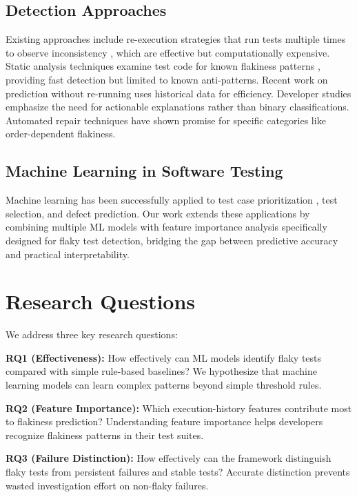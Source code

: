 \documentclass[conference]{IEEEtran}
\begin{document}
\subsection{Detection Approaches}
Existing approaches include re-execution strategies that run tests multiple times to observe inconsistency \cite{lam2019idflakies}, which are effective but computationally expensive. Static analysis techniques examine test code for known flakiness patterns \cite{pinto2020taxonomy}, providing fast detection but limited to known anti-patterns. Recent work on prediction without re-running \cite{alshammari2021flakify} uses historical data for efficiency. Developer studies \cite{eck2019understanding} emphasize the need for actionable explanations rather than binary classifications. Automated repair techniques \cite{parry2021flake} have shown promise for specific categories like order-dependent flakiness.

\subsection{Machine Learning in Software Testing}
Machine learning has been successfully applied to test case prioritization \cite{testprioritization}, test selection, and defect prediction. Our work extends these applications by combining multiple ML models with feature importance analysis specifically designed for flaky test detection, bridging the gap between predictive accuracy and practical interpretability.

\section{Research Questions}
We address three key research questions:

\textbf{RQ1 (Effectiveness):} How effectively can ML models identify flaky tests compared with simple rule-based baselines? We hypothesize that machine learning models can learn complex patterns beyond simple threshold rules.

\textbf{RQ2 (Feature Importance):} Which execution-history features contribute most to flakiness prediction? Understanding feature importance helps developers recognize flakiness patterns in their test suites.

\textbf{RQ3 (Failure Distinction):} How effectively can the framework distinguish flaky tests from persistent failures and stable tests? Accurate distinction prevents wasted investigation effort on non-flaky failures.
\end{document}
